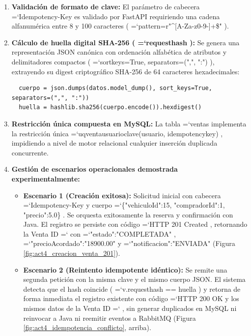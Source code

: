 \documentclass[11pt,a4paper]{article}
\renewcommand{\_}{\oldunderscore\allowbreak}
\DeclareRobustCommand{\texttt}[1]{%
  {\upshape\ttfamily\fontsize{9}{10.8}\selectfont\hyphenchar\font=`\-\relax #1}%
}
\begin{document}
\begin{enumerate}[leftmargin=*,itemsep=2pt,topsep=1pt]
  \item \textbf{Validación de formato de clave:} El parámetro de cabecera \texttt{Idempotency-Key} es validado por FastAPI requiriendo una cadena alfanumérica entre 8 y 100 caracteres (\texttt{pattern=\allowbreak{}r"\textasciicircum[A-Za-z0-9\_-]+\$"}).
  \item \textbf{Cálculo de huella digital SHA-256 (\texttt{request\_hash}):} Se genera una representación JSON canónica con ordenación alfabética de atributos y delimitadores compactos (\texttt{sort\_keys=\allowbreak{}True, separators=\allowbreak{}(",\allowbreak{}", ":\allowbreak{}")}), extrayendo su digest criptográfico SHA-256 de 64 caracteres hexadecimales:
  {\small
  \begin{lstlisting}
  cuerpo = json.dumps(datos.model_dump(), sort_keys=True, separators=(",", ":"))
  huella = hashlib.sha256(cuerpo.encode()).hexdigest()
  \end{lstlisting}
  }
  \item \textbf{Restricción única compuesta en MySQL:} La tabla \texttt{ventas} implementa la restricción única \texttt{uq\_venta\_usuario\_clave(usuario, idempotency\_key)}, impidiendo a nivel de motor relacional cualquier inserción duplicada concurrente.
  \item \textbf{Gestión de escenarios operacionales demostrada experimentalmente:}
  \begin{itemize}[leftmargin=*,itemsep=2pt]
    \item \textbf{Escenario 1 (Creación exitosa):} Solicitud inicial con cabecera \texttt{Idempotency-Key} y cuerpo \texttt{\{"vehiculoId":\allowbreak{}15, "compradorId":\allowbreak{}1, "precio":\allowbreak{}5.\allowbreak{}0\}}. Se orquesta exitosamente la reserva y confirmación con Java. El registro se persiste con código \texttt{HTTP 201 Created}, retornando la Venta ID \texttt{32} con \texttt{"estado":\allowbreak{}"COMPLETADA"}, \texttt{"precioAcordado":\allowbreak{}"18900.\allowbreak{}00"} y \texttt{"notificacion":\allowbreak{}"ENVIADA"} (Figura \ref{fig:act4_creacion_venta_201}).
    \item \textbf{Escenario 2 (Reintento idempotente idéntico):} Se remite una segunda petición con la misma clave y el mismo cuerpo JSON. El sistema detecta que el hash coincide (\texttt{v.\allowbreak{}request\_hash =\allowbreak{}= huella}) y retorna de forma inmediata el registro existente con código \texttt{HTTP 200 OK} y los mismos datos de la Venta ID \texttt{32}, sin generar duplicados en MySQL ni reinvocar a Java ni reemitir eventos a RabbitMQ (Figura \ref{fig:act4_idempotencia_conflicto}, arriba).

\end{itemize}
\end{enumerate}
\end{document}
